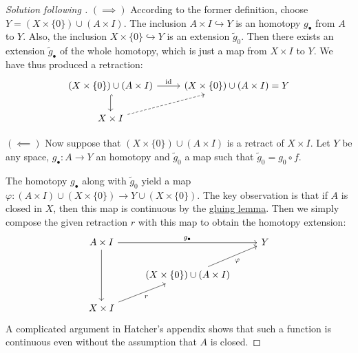 \documentclass{article}
\numberwithin{equation}{section}
\DeclareMathOperator{\id}{id}
\begin{document}
\begin{proof}[Solution following \cite{hatcher-at}]
	$(\implies)$ According to the former definition, choose $Y=(X\times\{0\})\cup(A\times I)$. The inclusion $A\times I\hookrightarrow Y$ is an homotopy $g_\bullet$ from $A$ to $Y$. Also, the inclusion $X\times\{0\}\hookrightarrow Y$ is an extension $\tilde{g}_0$. Then there exists an extension $\tilde{g}_\bullet$ of the whole homotopy, which is just a map from $X\times I$ to $Y$. We have thus produced a retraction:
	\[\begin{tikzcd}
		(X\times\{0\})\cup(A\times I)\arrow[d, hook]\arrow[r,"\id"]&(X\times\{0\})\cup(A\times I)=Y\\
		X\times I\arrow[ur,dashed]
	\end{tikzcd}\]
	
	$(\impliedby)$ Now suppose that $(X\times\{0\})\cup(A\times I)$ is a retract of $X\times I$. Let $Y$ be any space, $g_\bullet:A\to Y$ an homotopy and $\tilde{g}_0$ a map such that $\tilde{g}_0=g_0\circ f$.
	
	The homotopy $g_\bullet$ along with $\tilde{g}_0$ yield a map $\varphi:(A\times I)\cup (X\times\{0\})\to Y\cup (X\times\{0\})$. The key observation is that if $A$ is closed in $X$, then this map is continuous by the \href{https://en.wikipedia.org/wiki/Pasting_lemma#Formal_statement}{gluing lemma}. Then we simply compose the given retraction $r$ with this map to obtain the homotopy extension:
	\[\begin{tikzcd}
		A\times I\arrow[dd]\arrow[rr,"g_\bullet"]&&Y\\
		&(X\times\{0\})\cup(A\times I)\arrow[ur,"\varphi",swap]\\
		X\times I\arrow[ur,"r",swap]
	\end{tikzcd}\]
{	\color{red}A complicated argument in Hatcher's appendix shows that such a function is continuous even without the assumption that $A$ is closed.}
\end{proof}
\end{document}
